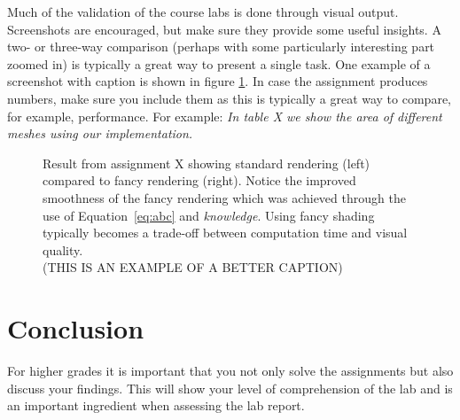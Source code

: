 \documentclass[onecolumn]{article}
\begin{document}
Much of the validation of the course labs is done through visual output. Screenshots are encouraged, but make sure they provide some useful insights. A two- or three-way comparison (perhaps with some particularly interesting part zoomed in) is typically a great way to present a single task. One example of a screenshot with caption is shown in figure \ref{fig:demo}. In case the assignment produces numbers, make sure you include them as this is typically a great way to compare, for example, performance. For example: \emph{In table X we show the area of different meshes using our implementation.}

\begin{figure}[t]
\centering
{}
\caption{\label{fig:demo}
Result from assignment X showing standard rendering (left) compared to fancy rendering (right). Notice the improved smoothness of the fancy rendering which was achieved through the use of Equation~\ref{eq:abc} and \emph{knowledge}. Using fancy shading typically becomes a trade-off between computation time and visual quality.\\(THIS IS AN EXAMPLE OF A BETTER CAPTION)}
\end{figure}


\section{Conclusion}
For higher grades it is important that you not only solve the assignments but also discuss your findings. This will show your level of comprehension of the lab and is an important ingredient when assessing  the lab report.
\end{document}
